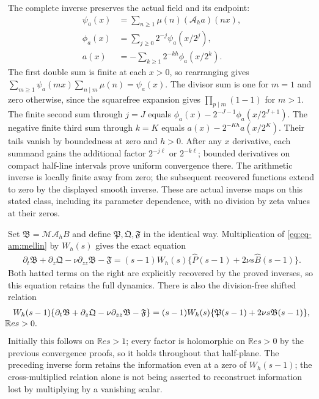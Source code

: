 The complete inverse preserves the actual field and its endpoint:
\begin{align*}
 \psi_a(x)&=\sum_{n\geq1}\mu(n)(\mathcal A_ha)(nx),\\
 \phi_a(x)&=\sum_{j\geq0}2^{-j}\psi_a(x/2^j),\\
 a(x)&=-\sum_{k\geq1}2^{-kh}\phi_a(x/2^k).
\end{align*}
The first double sum is finite at each $x>0$, so rearranging gives
$\sum_{m\geq1}\psi_a(mx)\sum_{n\mid m}\mu(n)=\psi_a(x)$.
The divisor sum is one for $m=1$ and zero otherwise, since the
squarefree expansion gives $\prod_{p\mid m}(1-1)$ for $m>1$.
The finite second sum through $j=J$ equals
$\phi_a(x)-2^{-J-1}\phi_a(x/2^{J+1})$.
The negative finite third sum through $k=K$ equals
$a(x)-2^{-Kh}a(x/2^K)$. Their tails vanish by boundedness at zero
and $h>0$. After any $x$ derivative, each summand gains the additional
factor $2^{-j\ell}$ or $2^{-k\ell}$; bounded derivatives on compact
half-line intervals prove uniform convergence there. The arithmetic
inverse is locally finite away from zero; the subsequent recovered
functions extend to zero by the displayed smooth inverse. These are
actual inverse maps on this stated class, including its parameter
dependence, with no division by zeta values at their zeros.

Set $\mathfrak B=\mathcal M\mathcal A_hB$ and define
$\mathfrak P,\mathfrak Q,\mathfrak F$ in the identical way.
Multiplication of \eqref{eq:cq-am:mellin} by $W_h(s)$ gives the exact
equation
\begin{align*}
 \partial_t\mathfrak B+\partial_z\mathfrak Q
       -\nu\partial_{zz}\mathfrak B-\mathfrak F
  =(s-1)W_h(s)\{\widehat P(s-1)+2\nu s\widehat B(s-1)\}.
\end{align*}
Both hatted terms on the right are explicitly recovered by the
proved inverses, so this equation retains the full dynamics. There is
also the division-free shifted relation
\begin{equation}
 \begin{split}
 W_h(s-1)\{\partial_t\mathfrak B+\partial_z\mathfrak Q
       -\nu\partial_{zz}\mathfrak B-\mathfrak F\}
  &=(s-1)W_h(s)\{\mathfrak P(s-1)
                        +2\nu s\mathfrak B(s-1)\},\\[-2pt]
 &\hspace{-60mm}\mathbb Re s>0.
 \end{split}
 \label{eq:cq-am:arithmeticpde}
\end{equation}
Initially this follows on $\mathbb Re s>1$; every factor is holomorphic on
$\mathbb Re s>0$ by the previous convergence proofs, so it holds throughout
that half-plane. The preceding inverse form retains the information
even at a zero of $W_h(s-1)$; the cross-multiplied relation alone is
not being asserted to reconstruct information lost by multiplying
by a vanishing scalar.

